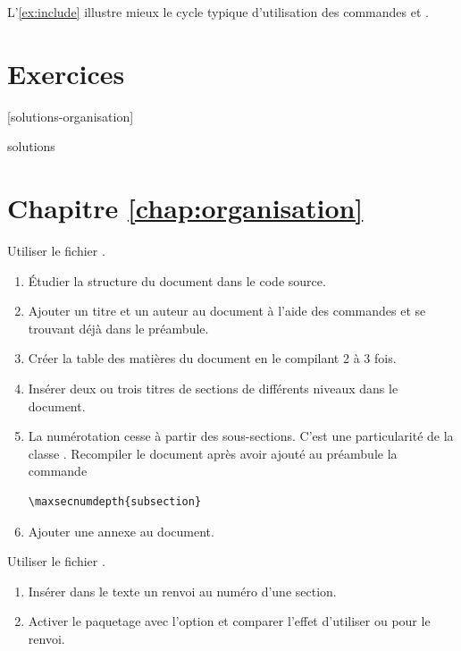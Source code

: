 L'\autoref{ex:include} illustre mieux le cycle typique
d'utilisation des commandes \cmd{} et \cmd{}.




\section{Exercices}
\label{sec:organisation:exercices}

[solutions-organisation]

\begin{Filesave}{solutions}
\section*{Chapitre \ref*{chap:organisation}}

\end{Filesave}

\begin{exercice}[nosol]
  Utiliser le fichier .
  \begin{enumerate}
  \item Étudier la structure du document dans le code source.
  \item Ajouter un titre et un auteur au document à l'aide des
    commandes \cmdprint{\title} et \cmdprint{\author} se trouvant déjà
    dans le préambule.
  \item Créer la table des matières du document en le compilant 2 à 3
    fois.
  \item Insérer deux ou trois titres de sections de différents niveaux
    dans le document.
  \item La numérotation cesse à partir des sous-sections. C'est une
    particularité de la classe . Recompiler le document
    après avoir ajouté au préambule la commande
\begin{lstlisting}
\maxsecnumdepth{subsection}
\end{lstlisting}
  \item Ajouter une annexe au document.
  \end{enumerate}
\end{exercice}

\begin{exercice}[nosol]
  Utiliser le fichier .
  \begin{enumerate}
  \item Insérer dans le texte un renvoi au numéro d'une section.
  \item Activer le paquetage  avec l'option
     et comparer l'effet d'utiliser \cmd{\ref} ou
    \cmd{\autoref} pour le renvoi.
  \end{enumerate}
\end{exercice}


